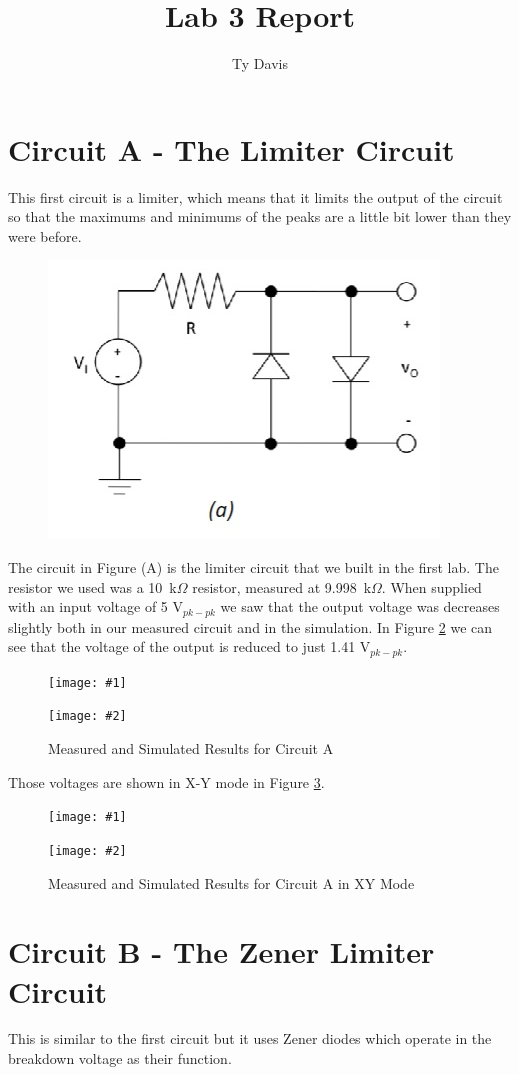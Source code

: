 \documentclass{article}
\author{Ty Davis}
\title{Lab 3 Report}
\newcommand{\twopics}[4]{
\begin{figure}
\begin{center}
  \begin{minipage}{.45\textwidth}
    \texttt{[image: \#1]}
  \end{minipage}
  \begin{minipage}{.45\textwidth}
    \texttt{[image: \#2]}
  \end{minipage}
  \label{#3}
  \caption{#4}
\end{center}
\end{figure}
}
\begin{document}
\maketitle

\section{Circuit A - The Limiter Circuit}

This first circuit is a limiter, which means that it
limits the output of the circuit so that the maximums
and minimums of the peaks are a little bit lower than
they were before.

\begin{figure}[h!]
  \centering
  \includegraphics{imgs/circuits/circuita.jpg}
  \label{circuita}
\end{figure}

The circuit in Figure (A) is the limiter
circuit that we built in the first lab. The resistor
we used was a 10~k$\Omega$ resistor, measured at
9.998~k$\Omega$. When supplied with an input voltage
of 5 V$_{pk-pk}$ we saw that the output voltage 
was decreases slightly both in our measured circuit 
and in the simulation. In Figure \ref{circuitalinear} 
we can see that the voltage of the output is reduced
to just 1.41 V$_{pk-pk}$.

\twopics{imgs/scope/scope_CircuitA}{imgs/sim/Circuit A}{circuitalinear}{Measured and Simulated Results for Circuit A}

Those voltages are shown in X-Y mode in Figure \ref{circuitaxy}.

\twopics{imgs/scope/scope_CircuitA_XY}{imgs/sim/Circuit A X-Y}{circuitaxy}{Measured and Simulated Results for Circuit A in XY Mode}


\pagebreak
\section{Circuit B - The Zener Limiter Circuit}
This is similar to the first circuit but it uses 
Zener diodes which operate in the breakdown voltage
as their function.
\end{document}
